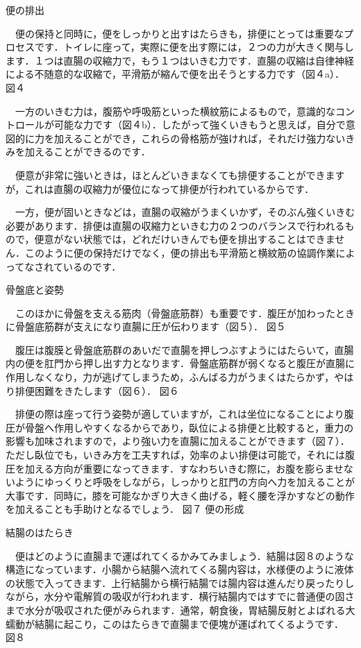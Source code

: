 便の排出

　便の保持と同時に，便をしっかりと出すはたらきも，排便にとっては重要なプロセスです．トイレに座って，実際に便を出す際には，２つの力が大きく関与します．１つは直腸の収縮力で，もう１つはいきむ力です．直腸の収縮は自律神経による不随意的な収縮で，平滑筋が縮んで便を出そうとする力です（図４a）．
図４

　一方のいきむ力は，腹筋や呼吸筋といった横紋筋によるもので，意識的なコントロールが可能な力です（図４b）．したがって強くいきもうと思えば，自分で意図的に力を加えることができ，これらの骨格筋が強ければ，それだけ強力ないきみを加えることができるのです．

　便意が非常に強いときは，ほとんどいきまなくても排便することができますが，これは直腸の収縮力が優位になって排便が行われているからです．

　一方，便が固いときなどは，直腸の収縮がうまくいかず，そのぶん強くいきむ必要があります．排便は直腸の収縮力といきむ力の２つのバランスで行われるもので，便意がない状態では，どれだけいきんでも便を排出することはできません．このように便の保持だけでなく，便の排出も平滑筋と横紋筋の協調作業によってなされているのです．

骨盤底と姿勢

　このほかに骨盤を支える筋肉（骨盤底筋群）も重要です．腹圧が加わったときに骨盤底筋群が支えになり直腸に圧が伝わります（図５）．
図５

　腹圧は腹膜と骨盤底筋群のあいだで直腸を押しつぶすようにはたらいて，直腸内の便を肛門から押し出す力となります．骨盤底筋群が弱くなると腹圧が直腸に作用しなくなり，力が逃げてしまうため，ふんばる力がうまくはたらかず，やはり排便困難をきたします（図６）．
図６

　排便の際は座って行う姿勢が適していますが，これは坐位になることにより腹圧が骨盤へ作用しやすくなるからであり，臥位による排便と比較すると，重力の影響も加味されますので，より強い力を直腸に加えることができます（図７）．ただし臥位でも，いきみ方を工夫すれば，効率のよい排便は可能で，それには腹圧を加える方向が重要になってきます．すなわちいきむ際に，お腹を膨らませないようにゆっくりと呼吸をしながら，しっかりと肛門の方向へ力を加えることが大事です．同時に，膝を可能なかぎり大きく曲げる，軽く腰を浮かすなどの動作を加えることも手助けとなるでしょう．
図７
便の形成

結腸のはたらき

　便はどのように直腸まで運ばれてくるかみてみましょう．結腸は図８のような構造になっています．小腸から結腸へ流れてくる腸内容は，水様便のように液体の状態で入ってきます．上行結腸から横行結腸では腸内容は進んだり戻ったりしながら，水分や電解質の吸収が行われます．横行結腸内ではすでに普通便の固さまで水分が吸収された便がみられます．通常，朝食後，胃結腸反射とよばれる大蠕動が結腸に起こり，このはたらきで直腸まで便塊が運ばれてくるようです．
図８


